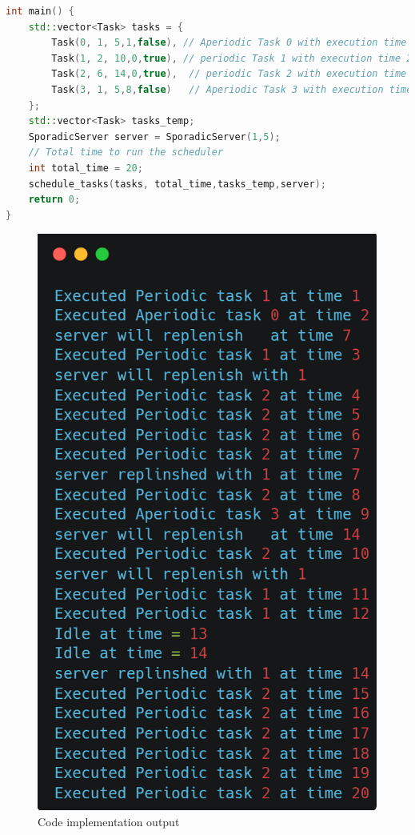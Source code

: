 \documentclass[conference]{IEEEtran}
\begin{document}
\begin{lstlisting}[language=C++]
int main() {
    std::vector<Task> tasks = {
        Task(0, 1, 5,1,false), // Aperiodic Task 0 with execution time 1 and period 5
        Task(1, 2, 10,0,true), // periodic Task 1 with execution time 2 and period 10
        Task(2, 6, 14,0,true),  // periodic Task 2 with execution time 3 and period 14
        Task(3, 1, 5,8,false)   // Aperiodic Task 3 with execution time 1 and period 5
    };
    std::vector<Task> tasks_temp;
    SporadicServer server = SporadicServer(1,5);
    // Total time to run the scheduler
    int total_time = 20;
    schedule_tasks(tasks, total_time,tasks_temp,server);
    return 0;
}
\end{lstlisting}
\begin{figure}[h]
    \centering
    \includegraphics[scale=0.2]{code_output.png}
    \caption{Code implementation output}
    \label{fig:code_output}
\end{figure}
\end{document}
